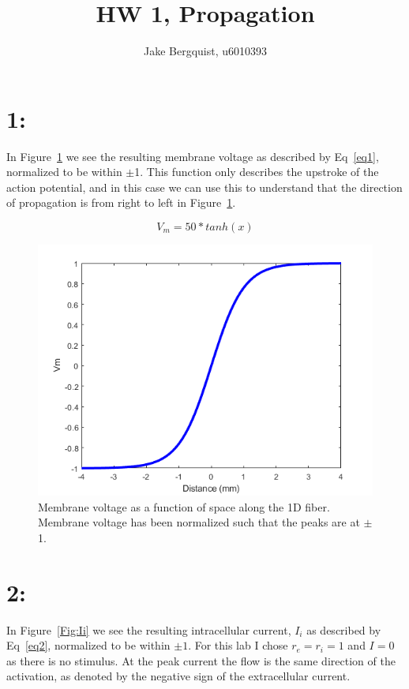 \documentclass[12pt]{article}
\begin{document}
\title{HW 1, Propagation}
\author{Jake Bergquist, u6010393}
\maketitle

\section{1: }
In Figure~\ref{Fig:Vm} we see the resulting membrane voltage as described by Eq~\ref{eq1}, normalized to be within $\pm$1. This function only describes the upstroke of the action potential, and in this case we can use this to understand that the direction of propagation is from right to left in Figure~\ref{Fig:Vm}. 

\begin{equation}
V_m = 50*tanh(x)
\label{eq1}
\end{equation}
\begin{figure}[H]
	
	\centering
	\includegraphics[width=.95\textwidth]{Figures/vm.png}
	
	\caption{Membrane voltage as a function of space along the 1D fiber. Membrane voltage has been normalized such that the peaks are at $\pm$1.}
	\label{Fig:Vm}
\end{figure}



\section{2: }
In Figure~\ref{Fig:Ii} we see the resulting intracellular current, $I_i$ as described by Eq~\ref{eq2}, normalized to be within $\pm 1$. For this lab I chose $r_e = r_i = 1$ and $I = 0$ as there is no stimulus. At the peak current the flow is the same direction of the activation, as denoted by the negative sign of the extracellular current.
\end{document}
